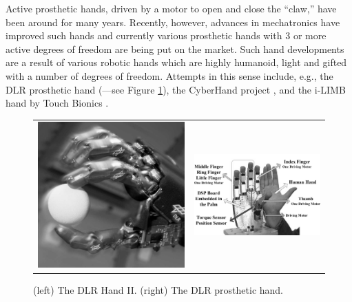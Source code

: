 Active prosthetic hands, driven by a motor to open and close the
``claw,'' have been around for many years.  Recently, however,
advances in mechatronics have improved such hands and currently
various prosthetic hands with 3 or more active degrees of freedom are
being put on the market.  Such hand developments are a result of
various robotic hands which are highly humanoid, light and gifted with
a number of degrees of freedom. Attempts in this sense include, e.g.,
the DLR prosthetic hand (\cite{Hua2006}---see Figure
\ref{fig:DLRHandII}), the CyberHand project \cite{cyberhand}, and the
i-LIMB hand by Touch Bionics \cite{ilimb}.

\begin{figure}
  \begin{tabular}{cc}
    \includegraphics[height=0.12\textheight]{figs/DLRHand-Ball-comp.jpg} &
    \includegraphics[height=0.12\textheight]{figs/DLR-Prothese.jpg}
  \end{tabular}
  \caption{(left) The DLR Hand II. (right) The DLR prosthetic hand.}
  \label{fig:DLRHandII}
\end{figure}

